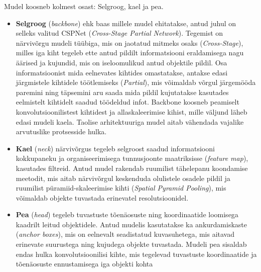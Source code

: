 Mudel koosneb kolmest osast: Selgroog, kael ja pea.

\begin{itemize}
\item
  \textbf{Selgroog} (\emph{backbone}) ehk baas millele mudel ehitatakse, antud juhul on selleks valitud CSPNet (\emph{Cross-Stage Partial Network}). Tegemist on närvivõrgu mudeli tüübiga, mis on jaotatud mitmeks osaks (\emph{Cross-Stage}), milles iga kiht tegeleb ette antud pildilt informatsiooni eraldamisega nagu äärised ja kujundid, mis on iseloomulikud antud objektile pildil. Osa informatsioonist mida eelnevates kihtides omastatakse, antakse edasi järgmistele kihtidele töötlemiseks (\emph{Partial}), mis võimaldab võrgul järgemööda paremini ning täpsemini aru saada mida pildil kujutatakse kasutades eelmistelt kihtidelt saadud töödeldud infot. Backbone koosneb peamiselt konvolutsioonilistest kihtidest ja allaskaleerimise kihist, mille väljund läheb edasi mudeli kaela. Taolise arhitektuuriga mudel aitab vähendada vajalike arvutuslike protsesside hulka.
\item
  \textbf{Kael} (\emph{neck}) närvivõrgus tegeleb selgroost saadud informatsiooni kokkupaneku ja organiseerimisega tunnusjoonte maatriksisse (\emph{feature map}), kasutades filtreid. Antud mudel rakendab ruumilist tähelepanu koondamise meetodit, mis aitab närvivõrgul keskenduda olulistele osadele pildil ja ruumilist püramiid-skaleerimise kihti (\emph{Spatial Pyramid Pooling}), mis võimaldab objekte tuvastada erinevatel resolutsioonidel.
\item
  \textbf{Pea} (\emph{head}) tegeleb tuvastuste tõenäosuste ning koordinaatide loomisega kaadrilt leitud objektidele. Antud mudelis kasutatakse ka ankurdamiskaste (\emph{anchor boxes}), mis on eelnevalt seadistatud kuvasuhetega, mis aitavad erinevate suurustega ning kujudega objekte tuvastada. Mudeli pea sisaldab endas hulka konvolutsioonilisi kihte, mis tegelevad tuvastuste koordinaatide ja tõenäosuste ennustamisega iga objekti kohta \cite{ref55}
\end{itemize}
